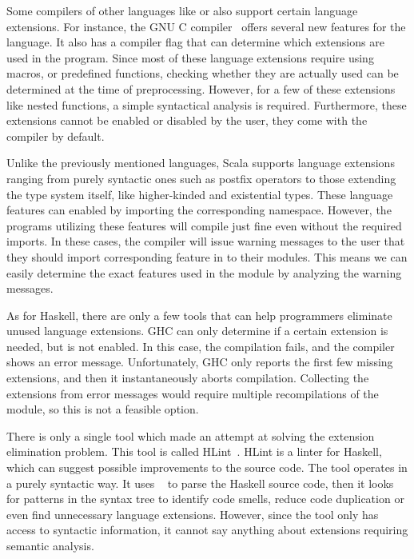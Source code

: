 \documentclass[main.tex]{subfiles}
\begin{document}
		
		Some compilers of other languages like  or  also support certain language extensions. For instance, the GNU C compiler~\cite{gnu-docs} offers several new features for the language. It also has a compiler flag that can determine which extensions are used in the program. Since most of these language extensions require using macros, or predefined functions, checking whether they are actually used can be determined at the time of preprocessing. However, for a few of these extensions like nested functions, a simple syntactical analysis is required. Furthermore, these extensions cannot be enabled or disabled by the user, they come with the compiler by default.
		
		Unlike the previously mentioned languages, Scala supports language extensions ranging from purely syntactic ones such as postfix operators to those extending the type system itself, like higher-kinded and existential types. These language features can enabled by importing the corresponding namespace. However, the programs utilizing these features will compile just fine even without the required imports. In these cases, the compiler will issue warning messages to the user that they should import corresponding feature in to their modules. This means we can easily determine the exact features used in the module by analyzing the warning messages.
		
		As for Haskell, there are only a few tools that can help programmers eliminate unused language extensions. GHC can only determine if a certain extension is needed, but is not enabled. In this case, the compilation fails, and the compiler shows an error message. Unfortunately, GHC only reports the first few missing extensions, and then it instantaneously aborts compilation. Collecting the extensions from error messages would require multiple recompilations of the module, so this is not a feasible option.
		
		There is only a single tool which made an attempt at solving the extension elimination problem. This tool is called HLint~\cite{hlint-bib}. HLint is a linter for Haskell, which can suggest possible improvements to the source code. The tool operates in a purely syntactic way. It uses ~\cite{haskell-src-exts} to parse the Haskell source code, then it looks for patterns in the syntax tree to identify code smells, reduce code duplication or even find unnecessary language extensions. However, since the tool only has access to syntactic information, it cannot say anything about extensions requiring semantic analysis.
	
\end{document}

